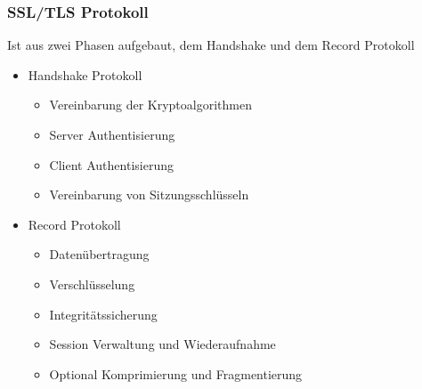 \subsubsection{SSL/TLS Protokoll}
Ist aus zwei Phasen aufgebaut, dem Handshake und dem Record Protokoll

\begin{itemize}
    \item Handshake Protokoll
            \begin{itemize}
                \item Vereinbarung der Kryptoalgorithmen 
                \item Server Authentisierung
                \item Client Authentisierung
                \item Vereinbarung von Sitzungsschlüsseln
            \end{itemize}
    \item Record Protokoll
            \begin{itemize}
                \item Datenübertragung
                \item Verschlüsselung
                \item Integritätssicherung
                \item Session Verwaltung und Wiederaufnahme
                \item Optional Komprimierung und Fragmentierung
            \end{itemize}
\end{itemize}